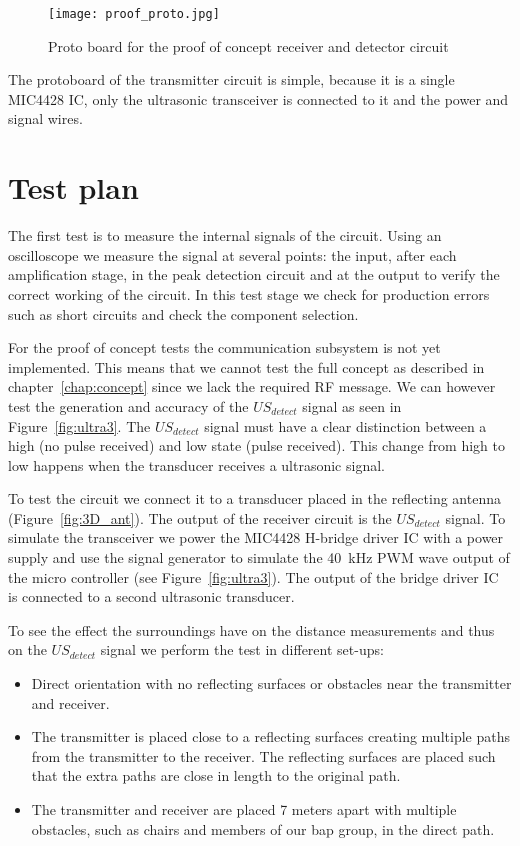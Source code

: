 \begin{figure}[H]
\centering
\texttt{[image: proof\_proto.jpg]}
\caption{Proto board for the proof of concept receiver and detector circuit}\label{fig:proto}
\label{fig:protoboard}
\end{figure}

The protoboard of the transmitter circuit is simple, because it is a single MIC4428 \cite{MIC4428}
 IC, only the ultrasonic transceiver is connected to it and the power and signal wires.

\section{Test plan}
The first test is to measure the internal signals of the circuit.
Using an oscilloscope we measure the signal at several points: the input, after each amplification stage, in the peak detection circuit and at the output to verify the correct working of the circuit.
In this test stage we check for production errors such as short circuits and check the component selection.

For the proof of concept tests the communication subsystem is not yet implemented.
This means that we cannot test the full concept as described in chapter~\ref{chap:concept} since we lack the required RF message.
We can however test the generation and accuracy of the $US_{detect}$ signal as seen in Figure~\ref{fig:ultra3}.
The $US_{detect}$ signal must have a clear distinction between a high (no pulse received) and low state (pulse received).
This change from high to low happens when the transducer receives a ultrasonic signal.

To test the circuit we connect it to a transducer placed in the reflecting antenna (Figure~\ref{fig:3D_ant}).
The output of the receiver circuit is the $US_{detect}$ signal.
To simulate the transceiver we power the MIC4428 \cite{MIC4428}
H-bridge driver IC with a power supply and use the signal generator to simulate the \SI{40}{\kilo\hertz} PWM wave output of the micro controller (see Figure~\ref{fig:ultra3}).
The output of the bridge driver IC is connected to a second ultrasonic transducer.

To see the effect the surroundings have on the distance measurements and thus on the $US_{detect}$ signal we perform the test in different set-ups:

\begin{itemize}
\item
Direct orientation with no reflecting surfaces or obstacles near the transmitter and receiver.
\item
The transmitter is placed close to a reflecting surfaces creating multiple paths from the transmitter to the receiver.
The reflecting surfaces are placed such that the extra paths are close in length to the original path.
\item
The transmitter and receiver are placed 7 meters apart with multiple obstacles, such as chairs and members of our bap group, in the direct path.
\end{itemize}

